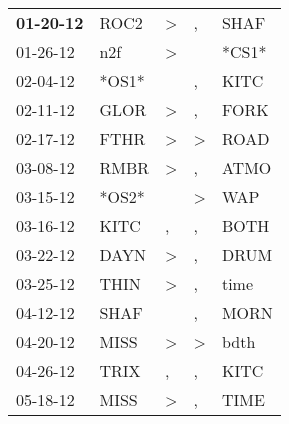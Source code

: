 \begin{supertabular}{p{0.07\textwidth}p{0.06\textwidth}p{0.02\textwidth}p{0.02\textwidth}p{0.06\textwidth}}
 \textbf{01-20-12\textsuperscript{}} &           ROC2\textsuperscript{} &     \textgreater &                , &           SHAF\textsuperscript{} \\
          01-26-12\textsuperscript{} &            n2f\textsuperscript{} &     \textgreater &                  &                            *CS1* \\
          02-04-12\textsuperscript{} &                            *OS1* &                  &                , &           KITC\textsuperscript{} \\
          02-11-12\textsuperscript{} &           GLOR\textsuperscript{} &     \textgreater &                , &           FORK\textsuperscript{} \\
          02-17-12\textsuperscript{} &           FTHR\textsuperscript{} &     \textgreater &     \textgreater &           ROAD\textsuperscript{} \\
          03-08-12\textsuperscript{} &           RMBR\textsuperscript{} &     \textgreater &                , &           ATMO\textsuperscript{} \\
          03-15-12\textsuperscript{} &                            *OS2* &                  &     \textgreater &            WAP\textsuperscript{} \\
          03-16-12\textsuperscript{} &           KITC\textsuperscript{} &                , &                , &           BOTH\textsuperscript{} \\
          03-22-12\textsuperscript{} &           DAYN\textsuperscript{} &     \textgreater &                , &           DRUM\textsuperscript{} \\
          03-25-12\textsuperscript{} &           THIN\textsuperscript{} &     \textgreater &                , &           time\textsuperscript{} \\
          04-12-12\textsuperscript{} &           SHAF\textsuperscript{} &                  &                , &           MORN\textsuperscript{} \\
          04-20-12\textsuperscript{} &           MISS\textsuperscript{} &     \textgreater &     \textgreater &           bdth\textsuperscript{} \\
          04-26-12\textsuperscript{} &           TRIX\textsuperscript{} &                , &                , &           KITC\textsuperscript{} \\
          05-18-12\textsuperscript{} &           MISS\textsuperscript{} &     \textgreater &                , &           TIME\textsuperscript{} \\

\end{supertabular}
